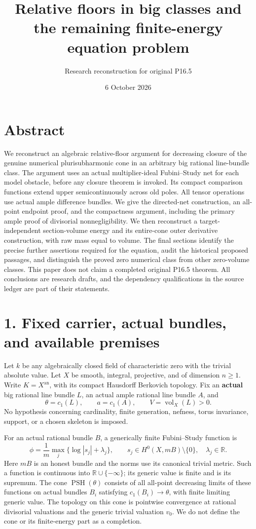 \documentclass[
  10pt,
]{article}
\title{Relative floors in big classes and the remaining finite-energy
equation problem}
\author{Research reconstruction for original P16.5}
\date{6 October 2026}
\begin{document}
\maketitle

\section{Abstract}\label{abstract}

We reconstruct an algebraic relative-floor argument for decreasing
closure of the genuine numerical plurisubharmonic cone in an arbitrary
big rational line-bundle class. The argument uses an actual
multiplier-ideal Fubini--Study net for each model obstacle, before any
closure theorem is invoked. Its compact comparison functions extend
upper semicontinuously across old poles. All tensor operations use
actual ample difference bundles. We give the directed-net construction,
an all-point endpoint proof, and the compactness argument, including the
primary ample proof of divisorial nonnegligibility. We then reconstruct
a target-independent section-volume energy and its entire-cone outer
derivative construction, with raw mass equal to volume. The final
sections identify the precise further assertions required for the
equation, audit the historical proposed passages, and distinguish the
proved zero numerical class from other zero-volume classes. This paper
does not claim a completed original P16.5 theorem. All conclusions are
research drafts, and the dependency qualifications in the source ledger
are part of their statements.

\section{1. Fixed carrier, actual bundles, and available
premises}\label{fixed-carrier-actual-bundles-and-available-premises}

Let \(k\) be any algebraically closed field of characteristic zero with
the trivial absolute value. Let \(X\) be smooth, integral, projective,
and of dimension \(n\geq1\). Write \(K=X^{\mathrm{an}}\), with its
compact Hausdorff Berkovich topology. Fix an \textbf{actual} big
rational line bundle \(L\), an actual ample rational line bundle \(A\),
and
\[\theta=c_1(L),\qquad a=c_1(A),\qquad V=\operatorname{vol}_X(L)>0.\] No
hypothesis concerning cardinality, finite generation, nefness, torus
invariance, support, or a chosen skeleton is imposed.

For an actual rational bundle \(B\), a generically finite Fubini--Study
function is \[\phi=\frac1m\max_j\{\log|s_j|+\lambda_j\},\qquad
s_j\in H^0(X,mB)\setminus\{0\},\quad \lambda_j\in\mathbb R.\] Here
\(mB\) is an honest bundle and the norms use its canonical trivial
metric. Such a function is continuous into \(\mathbb R\cup\{-\infty\}\);
its generic value is finite and is its supremum. The cone
\(\operatorname{PSH}(\theta)\) consists of all all-point decreasing
limits of these functions on actual bundles \(B_i\) satisfying
\(c_1(B_i)\to\theta\), with finite limiting generic value. The topology
on this cone is pointwise convergence at rational divisorial valuations
and the generic trivial valuation \(v_0\). We do not define the cone or
its finite-energy part as a completion.
\end{document}
